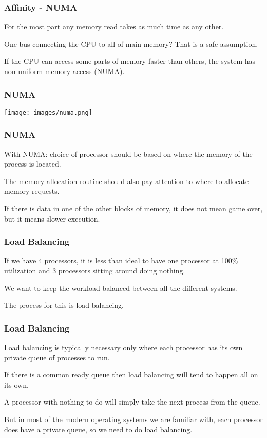 \begin{frame}
\frametitle{Affinity - NUMA}

For the most part any memory read takes as much time as any other. 

One bus connecting the CPU to all of main memory? That is a safe assumption.

  If the CPU can access some parts of memory faster than others, the system has \alert{non-uniform memory access} (NUMA).

\end{frame}

\begin{frame}
\frametitle{NUMA}

\begin{center}
	\texttt{[image: images/numa.png]}
\end{center}

\end{frame}

\begin{frame}
\frametitle{NUMA}

With NUMA: choice of processor should be based on where the memory of the process is located.

The memory allocation routine should also pay attention to where to allocate memory requests.
  
If there is data in one of the other blocks of memory, it does not mean game over, but it means slower execution.

\end{frame}

\begin{frame}
\frametitle{Load Balancing}

If we have 4 processors, it is less than ideal to have one processor at 100\% utilization and 3 processors sitting around doing nothing. 

We want to keep the workload balanced between all the different systems. 

The process for this is \alert{load balancing}.

\end{frame}

\begin{frame}
\frametitle{Load Balancing}

Load balancing is typically necessary only where each processor has its own private queue of processes to run. 

If there is a common ready queue then load balancing will tend to happen all on its own.

A processor with nothing to do will simply take the next process from the queue. 

But in most of the modern operating systems we are familiar with, each processor does have a private queue, so we need to do load balancing.

\end{frame}

